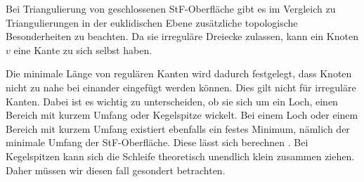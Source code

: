 



Bei Triangulierung von geschlossenen StF-Oberfläche gibt es im Vergleich zu Triangulierungen in der euklidischen Ebene zusätzliche topologische Besonderheiten zu beachten. Da sie irreguläre Dreiecke zulassen, kann ein Knoten $v$ eine Kante \irregulaereKante zu sich selbst haben.    



Die minimale Länge von regulären Kanten wird dadurch festgelegt, dass Knoten nicht zu nahe bei einander eingefügt werden können. Dies gilt nicht für irreguläre Kanten.
Dabei ist es wichtig zu unterscheiden, ob sie sich um ein Loch, einen Bereich mit kurzem Umfang oder Kegelspitze wickelt. Bei einem Loch oder einem Bereich mit kurzem Umfang existiert ebenfalls ein festes Minimum, nämlich der minimale Umfang der StF-Oberfläche. Diese lässt sich berechnen \cite{erickson:2005:generator}. Bei Kegelspitzen kann sich die Schleife  theoretisch unendlich klein zusammen ziehen. Daher müssen wir diesen fall gesondert betrachten.   





